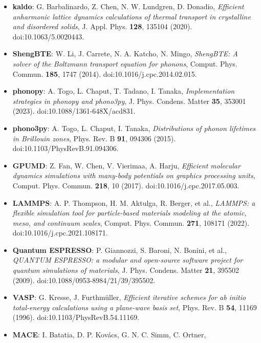 \documentclass[11pt,a4paper]{article}
\begin{document}
\begin{itemize}[leftmargin=1.4em, itemsep=0.25em]
  \item \textbf{kaldo}: G. Barbalinardo, Z. Chen, N. W. Lundgren, D. Donadio,
        \emph{Efficient anharmonic lattice dynamics calculations of thermal
        transport in crystalline and disordered solids}, J. Appl. Phys.
        \textbf{128}, 135104 (2020). doi:10.1063/5.0020443.
  \item \textbf{ShengBTE}: W. Li, J. Carrete, N. A. Katcho, N. Mingo,
        \emph{ShengBTE: A solver of the Boltzmann transport equation for
        phonons}, Comput. Phys. Commun. \textbf{185}, 1747 (2014).
        doi:10.1016/j.cpc.2014.02.015.
  \item \textbf{phonopy}: A. Togo, L. Chaput, T. Tadano, I. Tanaka,
        \emph{Implementation strategies in phonopy and phono3py}, J. Phys.
        Condens. Matter \textbf{35}, 353001 (2023).
        doi:10.1088/1361-648X/acd831.
  \item \textbf{phono3py}: A. Togo, L. Chaput, I. Tanaka, \emph{Distributions of
        phonon lifetimes in Brillouin zones}, Phys. Rev. B \textbf{91}, 094306
        (2015). doi:10.1103/PhysRevB.91.094306.
  \item \textbf{GPUMD}: Z. Fan, W. Chen, V. Vierimaa, A. Harju, \emph{Efficient
        molecular dynamics simulations with many-body potentials on graphics
        processing units}, Comput. Phys. Commun. \textbf{218}, 10 (2017).
        doi:10.1016/j.cpc.2017.05.003.
  \item \textbf{LAMMPS}: A. P. Thompson, H. M. Aktulga, R. Berger, et al.,
        \emph{LAMMPS: a flexible simulation tool for particle-based materials
        modeling at the atomic, meso, and continuum scales}, Comput. Phys.
        Commun. \textbf{271}, 108171 (2022). doi:10.1016/j.cpc.2021.108171.
  \item \textbf{Quantum ESPRESSO}: P. Giannozzi, S. Baroni, N. Bonini, et al.,
        \emph{QUANTUM ESPRESSO: a modular and open-source software project for
        quantum simulations of materials}, J. Phys. Condens. Matter \textbf{21},
        395502 (2009). doi:10.1088/0953-8984/21/39/395502.
  \item \textbf{VASP}: G. Kresse, J. Furthm\"uller, \emph{Efficient iterative
        schemes for ab initio total-energy calculations using a plane-wave basis
        set}, Phys. Rev. B \textbf{54}, 11169 (1996).
        doi:10.1103/PhysRevB.54.11169.
  \item \textbf{MACE}: I. Batatia, D. P. Kov\'acs, G. N. C. Simm, C. Ortner,

\end{itemize}
\end{document}
